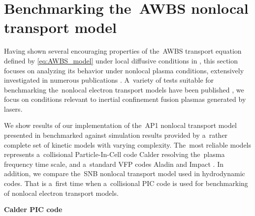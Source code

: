 \section{Benchmarking the~AWBS nonlocal transport model}
\label{sec:BenchmarkingAWBS}
Having shown several encouraging properties of the~AWBS transport 
equation defined by \eqref{eq:AWBS_model} under local diffusive conditions
in , this section focuses on analyzing 
its behavior under nonlocal plasma conditions, extensively investigated 
in numerous publications 
\cite{Malone_1975_15, Colombant_PoP2005, Bell_1981_83, LMV_1983_7, Brantov_Nonlocal_electron_transport_1998, schurtz2000, Sorbo_2015}.
A~variety of tests suitable for benchmarking the~nonlocal electron 
transport models have been published 
\cite{Epperlein_PoFB1991, marocchino2013, Sorbo_2015, 
Sorbo_2016, Sherlock_PoP2017, Brodrick_PoP2017}, we focus on 
conditions relevant to inertial confinement fusion plasmas generated by lasers.

We show results of our implementation of the~AP1 nonlocal transport model 
presented in  benchmarked against simulation results 
provided by a~rather complete set of kinetic models with varying complexity. 
The~most reliable models represents a~collisional Particle-In-Cell
code Calder \cite{Lefebvre_NF2003, Perez_PoP2012} resolving 
the~plasma frequency time scale, and a~standard VFP codes
Aladin and Impact \cite{Kingham_JCP2004}.
In addition, we compare the~SNB nonlocal transport model \cite{Schurtz_2000} 
used in hydrodynamic codes. 
That is a~first time when a~collisional PIC code is used
for benchmarking of nonlocal electron transport models. 

\textbf{Calder PIC code}

